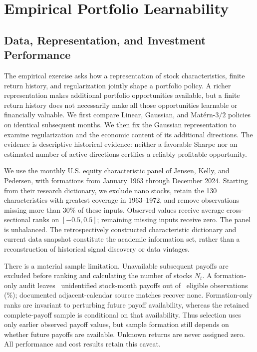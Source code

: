 \section{Empirical Portfolio Learnability}
\label{sec:empirics}

\subsection{Data, Representation, and Investment Performance}

The empirical exercise asks how a representation of stock characteristics,
finite return history, and regularization jointly shape a portfolio policy.
A richer representation makes additional portfolio opportunities available,
but a finite return history does not necessarily make all those opportunities
learnable or financially valuable. We first compare Linear, Gaussian, and
Mat\'ern-$3/2$ policies on identical subsequent months. We then fix the Gaussian
representation to examine regularization and the economic content of its
additional directions. The evidence is descriptive historical evidence:
neither a favorable Sharpe nor an estimated number of active directions
certifies a reliably profitable opportunity.

We use the monthly U.S. equity characteristic panel of Jensen, Kelly, and
Pedersen, with formations from January 1963 through December 2024. Starting
from their research dictionary, we exclude nano stocks, retain the 130
characteristics with greatest coverage in 1963--1972, and remove observations
missing more than 30\% of these inputs. Observed values receive average
cross-sectional ranks on $[-0.5,0.5]$; remaining missing inputs receive zero.
The panel is unbalanced. The retrospectively constructed characteristic
dictionary and current data snapshot constitute the academic information set,
rather than a reconstruction of historical signal discovery or data vintages.

There is a material sample limitation. Unavailable subsequent payoffs are
excluded before ranking and calculating the number of stocks $N_t$. A
formation-only audit leaves \MissingCount\ unidentified stock-month payoffs out
of \FormationCount\ eligible observations (\MissingShare\%); documented
adjacent-calendar source matches recover none. Formation-only ranks are
invariant to perturbing future payoff availability, whereas the retained
complete-payoff sample is conditional on that availability. Thus selection
uses only earlier observed payoff values, but sample formation still depends
on whether future payoffs are available. Unknown returns are never assigned
zero. All performance and cost results retain this caveat.

